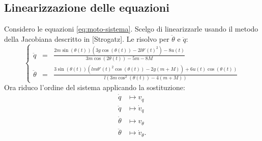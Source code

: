 \subsection{Linearizzazione delle equazioni}
Considero le equazioni \eqref{eq:moto-sistema}. Scelgo di linearizzarle usando il metodo della Jacobiana descritto in [Strogatz]. Le risolvo per $\ddot \theta$ e $\ddot q$:
\begin{equation*}
\left\{
\begin{aligned}
    \ddot q &= &\frac{2m\sin(\theta(t))\left(3g\cos(\theta(t))-2l\theta'(t)^2\right)-8u(t)} {3m\cos(2\theta(t))-5m-8M} \\
    \ddot \theta &= &\frac{3\sin(\theta(t))\left(lm\theta'(t)^2\cos(\theta(t))-2g(m+M)\right)+6u(t)\cos(\theta(t))}{l\left(3m\cos^2(\theta(t))-4(m+M)\right)}    
\end{aligned}
\right.
\end{equation*}
Ora riduco l'ordine del sistema applicando la sostituzione:
\begin{align}
    \dot q &\mapsto v_q \\
    \ddot q &\mapsto \dot v_q \\
    \dot \theta &\mapsto v_\theta \\
    \ddot \theta &\mapsto \dot v_\theta.
\end{align}

